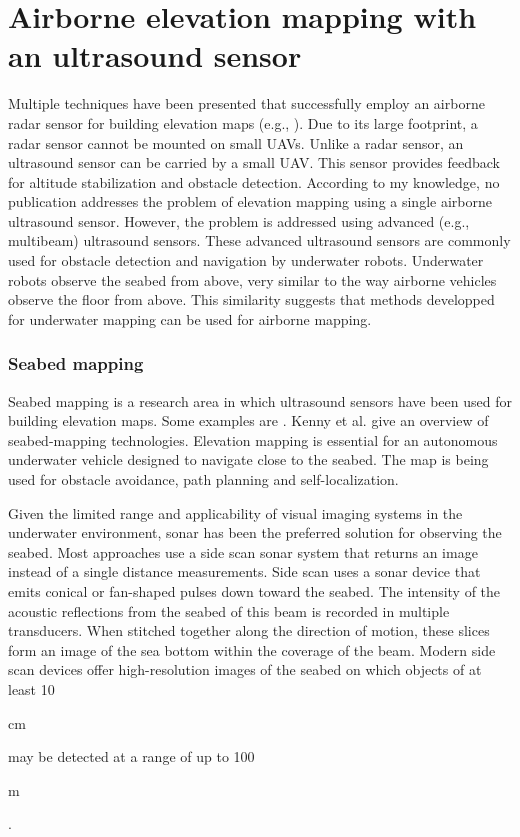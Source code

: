 \section{Airborne elevation mapping with an ultrasound sensor}
\label{sec:related-research-elevation-mapping}
Multiple techniques have been presented that successfully employ an airborne radar sensor for building elevation maps (e.g., \cite{foessel2000radar, weiß2006airborne}).
Due to its large footprint, a radar sensor cannot be mounted on small UAVs.
Unlike a radar sensor, an ultrasound sensor can be carried by a small UAV.
This sensor provides feedback for altitude stabilization and obstacle detection.
According to my knowledge, no publication addresses the problem of elevation mapping using a single airborne ultrasound sensor.
However, the problem is addressed using advanced (e.g., multibeam) ultrasound sensors.
These advanced ultrasound sensors are commonly used for obstacle detection and navigation by underwater robots.
Underwater robots observe the seabed from above, very similar to the way airborne vehicles observe the floor from above.
This similarity suggests that methods developped for underwater mapping can be used for airborne mapping.

\subsubsection{Seabed mapping}
Seabed mapping is a research area in which ultrasound sensors have been used for building elevation maps. Some examples are \cite{johnson1996seafloor,strauss1999multibeam,zerr1996three,evans2002three}.
Kenny et al. \cite{kenny2003overview} give an overview of seabed-mapping technologies.
Elevation mapping is essential for an autonomous underwater vehicle designed to navigate close to the seabed.
The map is being used for obstacle avoidance, path planning and self-localization.

Given the limited range and applicability of visual imaging systems in the underwater environment,
sonar has been the preferred solution \cite{blondel1997handbook} for observing the seabed.
Most approaches use a side scan sonar system that returns an image instead of a single distance measurements.
Side scan uses a sonar device that emits conical or fan-shaped pulses down toward the seabed.
The intensity of the acoustic reflections from the seabed of this beam is recorded in multiple transducers.
When stitched together along the direction of motion, these slices form an image of the sea bottom within the coverage of the beam.
Modern side scan devices offer high-resolution images of the seabed on which objects of at least 10\begin{small}cm\end{small} may be detected at a range of up to 100\begin{small}m\end{small}.

